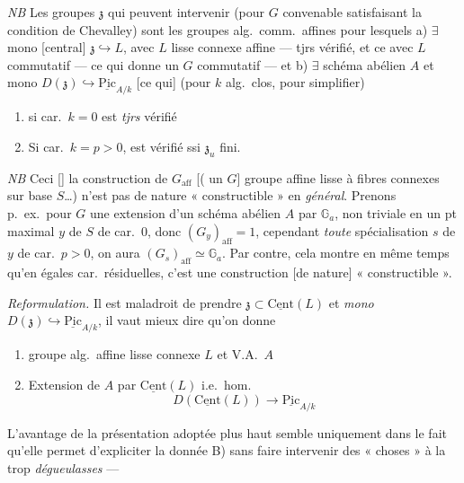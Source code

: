\documentclass[11pt,a4paper]{article}
\begin{document}
\emph{NB} Les groupes $\mathfrak{z}$ qui peuvent intervenir (pour $G$ convenable satisfaisant la condition de Chevalley) sont  les groupes alg.\ comm.\ affines pour lesquels a) $\exists$ mono [central] $\mathfrak{z} \hookrightarrow L$, avec $L$ lisse connexe affine --- tjrs vérifié, et ce avec $L$ commutatif --- ce qui donne un $G$ commutatif --- et b) $\exists$ schéma abélien $A$ et mono $D(\mathfrak{z}) \hookrightarrow \underline{\mathrm{Pic}}_{A/k}$  [ce qui] (pour $k$ alg.\ clos, pour simplifier)
\begin{enumerate}
  \item[1°)] si car.\ $k = 0$ \struck{\ill{}} est \emph{tjrs} vérifié
  \item[2°)] Si car.\ $k = p > 0$, est vérifié ssi $\mathfrak{z}_{u}$ fini.
\end{enumerate}

\emph{NB} Ceci  []  la construction de $G_{\mathrm{aff}}$  [( un $G$] groupe affine lisse à fibres connexes sur base $S$…) n'est pas de nature « constructible » en \emph{général}. Prenons p.\ ex.\ pour $G$ une extension d'un schéma abélien $A$ par $\mathbb{G}_{a}$, non triviale en un pt maximal $y$ de $S$ de car.\ $0$, donc $(G_{y})_{\mathrm{aff}} = 1$, cependant  \emph{toute} spécialisation $s$ de $y$ de car.\ $p > 0$, on aura $(G_{s})_{\mathrm{aff}} \simeq \mathbb{G}_{a}$.
Par contre, cela montre en même temps qu'en égales car.\ résiduelles, c'est une construction [de nature] « constructible ».

\emph{Reformulation.} Il est maladroit de prendre $\mathfrak{z} \subset \underline{\mathrm{Cent}}(L)$ et \emph{mono} $D(\mathfrak{z}) \hookrightarrow \underline{\mathrm{Pic}}_{A/k}$, il vaut mieux dire qu'on donne
\begin{enumerate}
  \item[A)] groupe alg.\ affine lisse connexe $L$ et V.A.\ $A$
  \item[B)] Extension de $A$ par $\underline{\mathrm{Cent}}(L)$ i.e.\ hom.
  \[
    D(\underline{\mathrm{Cent}}(L)) \longrightarrow \underline{\mathrm{Pic}}_{A/k}
  \]
\end{enumerate}
L'avantage de la présentation adoptée plus haut semble uniquement dans le fait qu'elle permet d'expliciter la donnée B) sans faire intervenir des « choses » à la  trop \emph{dégueulasses} —
\end{document}
